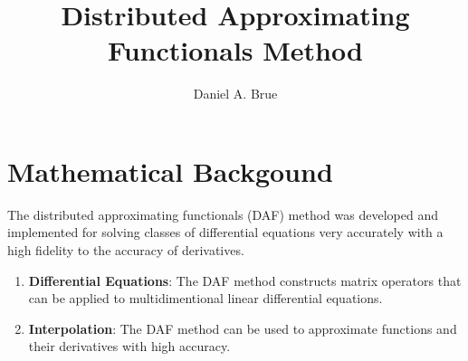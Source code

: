 \documentclass[letterpaper]{article}
\begin{document}
\title{Distributed Approximating Functionals Method}
\author{Daniel A. Brue}
\maketitle
\section{Mathematical Backgound}

The distributed approximating functionals (DAF) method was developed 
and implemented for solving classes of differential equations very accurately
with a high fidelity to the accuracy of derivatives. 

\begin{enumerate}
\item{\bf Differential Equations}: The DAF method constructs matrix operators that
	can be applied to multidimentional linear differential equations. 
\item{\bf Interpolation}: The DAF method can be used to approximate functions and
	their derivatives with high accuracy. 
\end{enumerate}
\end{document}

